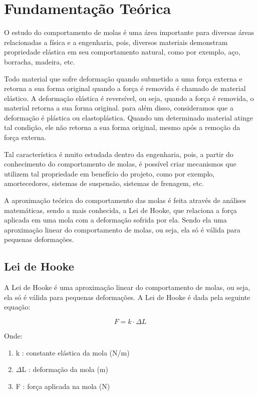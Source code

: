 \section{Fundamentação Teórica}
O estudo do comportamento de molas é uma área importante para diversas áreas relacionadas a física e a engenharia, pois,
diversos materiais demonstram propriedade elástica em seu comportamento natural, como por exemplo, aço, borracha, madeira, etc.

Todo material que sofre deformação quando submetido a uma força externa e retorna a sua forma original quando a força é removida é chamado de material elástico.
A deformação elástica é reversível, ou seja, quando a força é removida, o material retorna a sua forma original. para além disso, consideramos que a deformação é
plástica ou elastoplástica. Quando um determinado material atinge tal condição, ele não retorna a sua forma original, mesmo após a remoção da força externa.

Tal característica é muito estudada dentro da engenharia, pois, a partir do conhecimento do comportamento de molas, é possível criar mecanismos que utilizem
tal propriedade em benefício do projeto, como por exemplo, amortecedores, sistemas de suspensão, sistemas de frenagem, etc.

A aproximação teórica do comportamento das molas é feita através de análises matemáticas, sendo a mais conhecida, a Lei de Hooke, que relaciona a força aplicada
em uma mola com a deformação sofrida por ela. Sendo ela uma aproximação linear do comportamento de molas, ou seja, ela só é válida para pequenas deformações.

\subsection{Lei de Hooke}
A Lei de Hooke é uma aproximação linear do comportamento de molas, ou seja, ela só é válida para pequenas deformações. A Lei de Hooke é dada pela seguinte equação:

\begin{equation}
    F = k \cdot \Delta L
\end{equation}

Onde:
\begin{enumerate}
    \item k : constante elástica da mola (N/m)
    \item $\Delta$L : deformação da mola (m)
    \item F : força aplicada na mola (N)
\end{enumerate}

